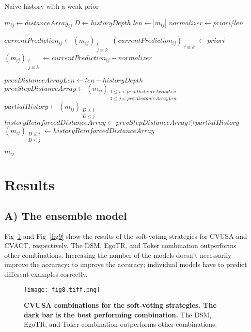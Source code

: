 \documentclass[10pt,letterpaper]{article}
\begin{document}
\begin{algorithm}[H]
  \caption{Naive history with a weak prior}\label{alg:three}
  $m_{ij} \gets distanceArray_{ij}$\;
  $D \gets historyDepth$\;
  $len \gets |m_{ij}|$\;
  $normalizer \gets priori/ len$\;
  
   {
      $currentPrediction_{ij} \gets (m_{ij})_{\substack{i\\ j \equiv k }}$\;
      $ (currentPrediction_{ij})_{\substack{i \equiv k}} \gets priori$\;
      $(m_{ij})_{\substack{i\\ j \equiv k }} \gets currentPrediction_{ij} - normalizer$\;
  }
  
   {
      $prevDistanceArrayLen \gets len - historyDepth$\;
      $prevStepDistanceArray \gets (m_{ij})_{\substack{1\le i < prevDistanceArrayLen \\ 1\le j < prevDistanceArrayLen }}$\;
      $partialHistory \gets (m_{ij})_{\substack{D \le i \\ D \le j}}$\;
      $historyReinforcedDistanceArray \gets prevStepDistanceArray \odot partialHistory$\;
      $(m_{ij})_{\substack{D \le i \\ D \le j}} \gets historyReinforcedDistanceArray$\;
  }
  
  \Return $m_{ij}$\;
\end{algorithm}
\FloatBarrier

\section*{Results}
\subsection*{A) The ensemble model}
Fig~\ref{fig8} and Fig~\ref{fig9} show the results of the soft-voting strategies for CVUSA and CVACT, respectively. The DSM, EgoTR, and Toker combination outperforms other combinations. Increasing the number of the models doesn’t necessarily improve the accuracy; to improve the accuracy; individual models have to predict different examples correctly.

\begin{figure}[!ht]
  \caption{{\bf CVUSA combinations for the soft-voting strategies. The dark bar is the best performing combination.} The DSM, EgoTR, and Toker combination outperforms other combinations.}
  \texttt{[image: fig8.tiff.png]}
  
  \label{fig8}
\end{figure}
\end{document}
